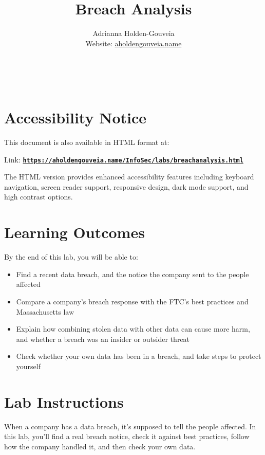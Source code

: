 \documentclass[12pt]{article}
\title{Breach Analysis}
\author{
        Adrianna Holden-Gouveia \\
        Website: \href{https://aholdengouveia.name}{aholdengouveia.name}\\ 
        \date{\vspace{-5ex}}
        \faGithub {: aholdengouveia} \\
        \faTwitter {: aholdengouveia} \\
        }
\begin{document}
    

\maketitle

\section*{Accessibility Notice}
This document is also available in HTML format at:

Link: \href{https://aholdengouveia.name/InfoSec/labs/breachanalysis.html}{\textbf{\nolinkurl{https://aholdengouveia.name/InfoSec/labs/breachanalysis.html}}}

The HTML version provides enhanced accessibility features including keyboard navigation, screen reader support, responsive design, dark mode support, and high contrast options.



\section*{Learning Outcomes}
By the end of this lab, you will be able to:
\begin{itemize}
    \item Find a recent data breach, and the notice the company sent to the people affected
    \item Compare a company's breach response with the FTC's best practices and Massachusetts law
    \item Explain how combining stolen data with other data can cause more harm, and whether a breach was an insider or outsider threat
    \item Check whether your own data has been in a breach, and take steps to protect yourself
\end{itemize}

\section*{Lab Instructions}
When a company has a data breach, it's supposed to tell the people affected. In this lab, you'll find a real breach notice, check it against best practices, follow how the company handled it, and then check your own data.
\end{document}
